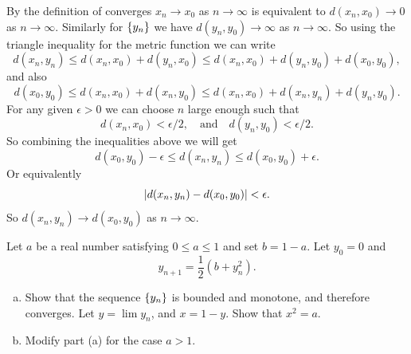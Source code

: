 \begin{solution}
	By the definition of converges $ x_n\to x_0 $ as $ n\to\infty $ is equivalent to $ d(x_n,x_0) \to 0 $ as $ n\to\infty $. Similarly for $ \{y_n\} $ we have $ d(y_n,y_0) \to \infty $ as $ n\to\infty $.  So using the triangle inequality for the metric function we can write
	\[ d(x_n,y_n) \leq d(x_n,x_0) + d(y_n,x_0) \leq d(x_n,x_0) + d(y_n,y_0) + d(x_0,y_0), \]
	and also
	\[ d(x_0,y_0) \leq d(x_n,x_0)+d(x_n,y_0) \leq d(x_n,x_0) + d(x_n,y_n) + d(y_n,y_0). \]
	For any given $ \epsilon>0 $ we can choose $ n $ large enough such that
	\[ d(x_n,x_0) < \epsilon/2, \quad\text{and}\quad d(y_n,y_0)<\epsilon/2. \]
	So combining the inequalities above we will get
	\[ d(x_0,y_0) - \epsilon \leq d(x_n,y_n) \leq d(x_0,y_0) + \epsilon. \]
	Or equivalently
	\[ |d(x_n,y_n) - d(x_0,y_0)| <\epsilon. \]
	So $ d(x_n,y_n) \to d(x_0,y_0) $ as $ n\to\infty $.
\end{solution}


\begin{problem}
	Let $ a $ be a real number satisfying $ 0\leq a\leq 1 $ and set $ b=1-a $. Let $ y_0 =0 $ and
	\[ y_{n+1} = \frac{1}{2}(b+y_n^2). \]
	\begin{enumerate}[(a)]
		\item Show that the sequence $ \{y_n\} $ is bounded and monotone, and therefore converges. Let $ y=\lim y_n $, and $ x = 1-y $. Show that $ x^2=a $.
		\item Modify part (a) for the case $ a>1 $.
\end{enumerate}

	
\end{problem}

